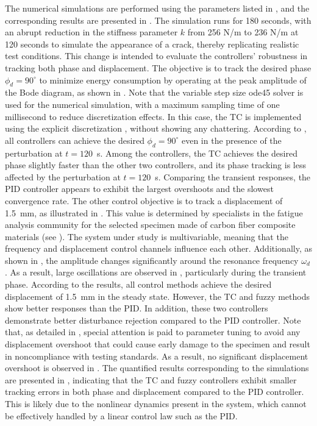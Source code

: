 \documentclass[preprint,12pt]{elsarticle}
\begin{document}
The numerical simulations are performed using the parameters listed in , and the corresponding results are presented in . The simulation runs for 180 seconds, with an abrupt reduction in the stiffness parameter $k$ from 256 N/m to 236 N/m at 120 seconds to simulate the appearance of a crack, thereby replicating realistic test conditions. This change is intended to evaluate the controllers' robustness in tracking both phase and displacement. The objective is to track the desired phase $\phi_d = 90^\circ$ to minimize energy consumption by operating at the peak amplitude of the Bode diagram, as shown in . Note that the variable step size {\selectfont ode45} solver is used for the numerical simulation, with a maximum sampling time of one millisecond to reduce discretization effects. In this case, the TC is implemented using the explicit discretization , without showing any chattering.
According to , all controllers can achieve the desired $\phi_d = 90^\circ$ even in the presence of the perturbation at $t = 120$~s. Among the controllers, the TC achieves the desired phase slightly faster than the other two controllers, and its phase tracking is less affected by the perturbation at $t = 120$~s. Comparing the transient responses, the PID controller appears to exhibit the largest overshoots and the slowest convergence rate.
The other control objective is to track a displacement of 1.5~mm, as illustrated in . This value is determined by specialists in the fatigue analysis community for the selected specimen made of carbon fiber composite materials (see ). The system under study is multivariable, meaning that the frequency and displacement control channels influence each other. Additionally, as shown in , the amplitude changes significantly around the resonance frequency $\omega_d$. As a result, large oscillations are observed in , particularly during the transient phase. According to the results, all control methods achieve the desired displacement of 1.5~mm in the steady state. However, the TC and fuzzy methods show better responses than the PID. In addition, these two controllers demonstrate better disturbance rejection compared to the PID controller. Note that, as detailed in , special attention is paid to parameter tuning to avoid any displacement overshoot that could cause early damage to the specimen and result in noncompliance with testing standards. As a result, no significant displacement overshoot is observed in . The quantified results corresponding to the simulations are presented in , indicating that the TC and fuzzy controllers exhibit smaller tracking errors in both phase and displacement compared to the PID controller. This is likely due to the nonlinear dynamics present in the system, which cannot be effectively handled by a linear control law such as the PID.
\end{document}
